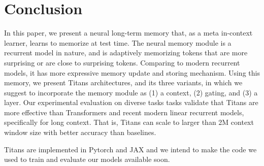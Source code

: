 \section{Conclusion}\label{sec:concolusion}
In this paper, we present a neural long-term memory that, as a meta in-context learner, learns to memorize at test time. The neural memory module is a recurrent model in nature, and is adaptively memorizing tokens that are more surprising or are close to surprising tokens. Comparing to modern recurrent models, it has more expressive memory update and storing mechanism. Using this memory, we present Titans architectures, and its three variants, in which we suggest to incorporate the memory module as (1) a context, (2) gating, and (3) a layer.  Our experimental evaluation on diverse tasks tasks validate that Titans are more effective than Transformers and recent modern linear recurrent models, specifically for long context. That is, Titans can scale to larger than 2M context window size with better accuracy than baselines. 


Titans are implemented in Pytorch and JAX and we intend to make the code we used to train and evaluate our models available soon.
